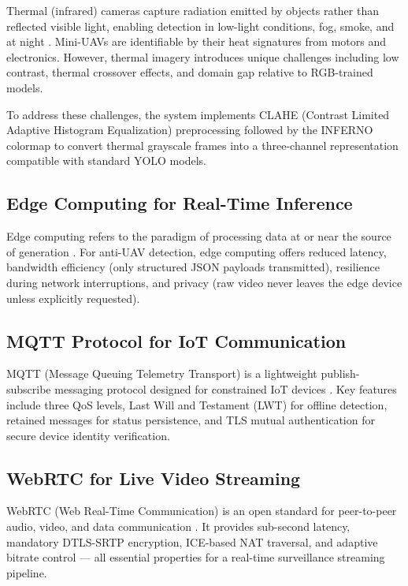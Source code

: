 \documentclass[12pt,a4paper]{report}
\begin{document}
Thermal (infrared) cameras capture radiation emitted by objects rather than
reflected visible light, enabling detection in low-light conditions, fog, smoke,
and at night \cite{delleji2024thermal}. Mini-UAVs are identifiable by their heat
signatures from motors and electronics. However, thermal imagery introduces unique
challenges including low contrast, thermal crossover effects, and domain gap
relative to RGB-trained models.

To address these challenges, the system implements CLAHE (Contrast Limited
Adaptive Histogram Equalization) preprocessing followed by the INFERNO colormap
to convert thermal grayscale frames into a three-channel representation compatible
with standard YOLO models.

\subsection{Edge Computing for Real-Time Inference}

Edge computing refers to the paradigm of processing data at or near the source
of generation \cite{shi2016edge}. For anti-UAV detection, edge computing offers
reduced latency, bandwidth efficiency (only structured JSON payloads transmitted),
resilience during network interruptions, and privacy (raw video never leaves the
edge device unless explicitly requested).

\subsection{MQTT Protocol for IoT Communication}

MQTT (Message Queuing Telemetry Transport) is a lightweight publish-subscribe
messaging protocol designed for constrained IoT devices \cite{mqtt5spec}. Key
features include three QoS levels, Last Will and Testament (LWT) for offline
detection, retained messages for status persistence, and TLS mutual authentication
for secure device identity verification.

\subsection{WebRTC for Live Video Streaming}

WebRTC (Web Real-Time Communication) is an open standard for peer-to-peer audio,
video, and data communication \cite{webrtcspec}. It provides sub-second latency,
mandatory DTLS-SRTP encryption, ICE-based NAT traversal, and adaptive bitrate
control — all essential properties for a real-time surveillance streaming pipeline.
\end{document}
